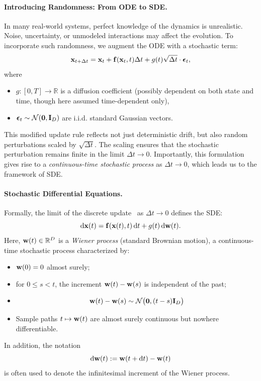 \paragraph{Introducing Randomness: From ODE to SDE.} In many real-world systems, perfect knowledge of the dynamics is unrealistic. Noise, uncertainty, or unmodeled interactions may affect the evolution. To incorporate such randomness, we augment the ODE with a stochastic term:
\begin{equation}
    {\mathbf{x}}_{t+\Delta t} = {\mathbf{x}}_t + {\mathbf{f}}({\mathbf{x}}_t, t)\Delta t + g(t)\sqrt{\Delta t} \cdot \bm{\epsilon}_t,
    \label{eq:euler-sde}
\end{equation}
where
\begin{itemize}
    \item $g: [0,T] \to \mathbb{R}$ is a diffusion coefficient (possibly dependent on both state and time, though here assumed time-dependent only),
    \item $\bm{\epsilon}_t \sim \mathcal{N}(\bm{0}, {\mathbf{I}}_D)$ are i.i.d. standard Gaussian vectors.
\end{itemize}

This modified update rule reflects not just deterministic drift, but also random perturbations scaled by $ \sqrt{\Delta t} $. The scaling ensures that the stochastic perturbation remains finite in the limit $ \Delta t \to 0 $. Importantly, this formulation gives rise to a \emph{continuous-time stochastic process} as $ \Delta t \to 0 $, which leads us to the framework of SDE.

\paragraph{Stochastic Differential Equations.}
Formally, the limit of the discrete update~ as $ \Delta t \to 0 $ defines the SDE:
\begin{equation}
    \mathop{}\!\mathrm{d} {\mathbf{x}}(t) = {\mathbf{f}}({\mathbf{x}}(t), t)\mathop{}\!\mathrm{d} t + g(t) \mathop{}\!\mathrm{d} {\mathbf{w}}(t).
    \label{eq:sde}
\end{equation}
Here, $ {\mathbf{w}}(t) \in \mathbb{R}^D $ is a \emph{Wiener process} (standard Brownian motion), a continuous-time stochastic process characterized by:
\begin{itemize}
    \item {} $ {\mathbf{w}}(0) = 0 $ almost surely;
    \item {}  for $ 0 \leq s < t $, the increment $ {\mathbf{w}}(t) - {\mathbf{w}}(s) $ is independent of the past;
    \item {} 
    \begin{align}\label{eq:wiener-gaussian}
        {\mathbf{w}}(t) - {\mathbf{w}}(s) \sim \mathcal{N}\bigl(\bm{0}, (t - s){\mathbf{I}}_D \bigr)
    \end{align}
    \item {} Sample paths $ t \mapsto {\mathbf{w}}(t) $ are almost surely continuous but nowhere differentiable.
\end{itemize}
In addition, the notation
\[
\mathop{}\!\mathrm{d} {\mathbf{w}}(t) := {\mathbf{w}}(t + \mathop{}\!\mathrm{d} t) - {\mathbf{w}}(t)
\]
is often used to denote the infinitesimal increment of the Wiener process. 


